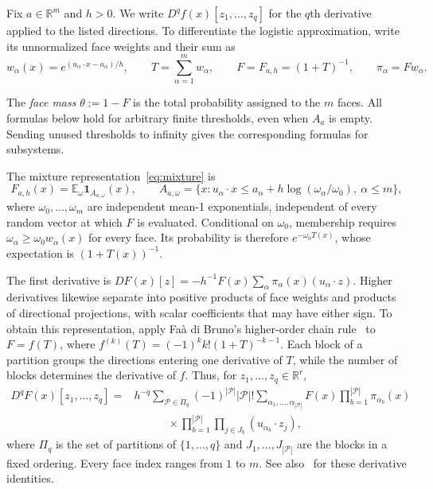 \documentclass[11pt,letterpaper]{article}
\theoremstyle{remark}
\newcommand{\E}{\mathbb E}
\newcommand{\R}{\mathbb R}
\newcommand{\ind}{\mathbf 1}
\begin{document}
Fix \(a\in\R^m\) and \(h>0\). We write
\(D^qf(x)[z_1,\ldots,z_q]\) for the \(q\)th derivative applied to
the listed directions. To differentiate the logistic approximation,
write its unnormalized face weights and their sum as
\[
 w_\alpha(x)=e^{(u_\alpha\cdot x-a_\alpha)/h},\qquad
 T=\sum_{\alpha=1}^m w_\alpha,\qquad
 F=F_{a,h}=(1+T)^{-1},\qquad \pi_\alpha=Fw_\alpha.
\]

The \emph{face mass} \(\theta:=1-F\) is the total probability assigned
to the \(m\) faces. All formulas below hold for arbitrary finite
thresholds, even when \(A_a\) is empty. Sending unused thresholds
to infinity gives the corresponding formulas for subsystems.

The mixture representation~\eqref{eq:mixture} is
\[
 F_{a,h}(x)=\E_\omega\ind_{A_{a,\omega}}(x),\qquad
 A_{a,\omega}=\{x:u_\alpha\cdot x\le
 a_\alpha+h\log(\omega_\alpha/\omega_0),\ \alpha\le m\},
\]
where \(\omega_0,\ldots,\omega_m\) are independent mean-1
exponentials, independent of every random vector at which \(F\) is
evaluated. Conditional on \(\omega_0\), membership requires
\(\omega_\alpha\ge\omega_0w_\alpha(x)\) for every face.
Its probability is therefore \(e^{-\omega_0T(x)}\), whose
expectation is \((1+T(x))^{-1}\).

The first derivative is
\(DF(x)[z]=-h^{-1}F(x)\sum_\alpha\pi_\alpha(x)(u_\alpha\cdot z)\).
Higher derivatives likewise separate into positive products of face
weights and products of directional projections, with scalar coefficients
that may have either sign. To obtain this representation, apply
Fa\`a di Bruno's higher-order chain rule~\cite{Comtet1974}
to \(F=f(T)\), where
\(f^{(k)}(T)=(-1)^k k!(1+T)^{-k-1}\). Each block of a partition
groups the directions entering one derivative of \(T\), while the
number of blocks determines the derivative of \(f\). Thus, for
\(z_1,\ldots,z_q\in\R^r\),
\begin{equation}
 \begin{split}
 D^qF(x)[z_1,\ldots,z_q]
 ={}&h^{-q}\sum_{\mathcal P\in\Pi_q}(-1)^{|\mathcal P|}|\mathcal P|!
 \sum_{\alpha_1,\ldots,\alpha_{|\mathcal P|}}
 F(x)\prod_{b=1}^{|\mathcal P|}\pi_{\alpha_b}(x)\\
 &\hspace{3em}\times
 \prod_{b=1}^{|\mathcal P|}\prod_{j\in J_b}
 (u_{\alpha_b}\cdot z_j),
 \end{split}
 \label{appx-eq:partition-derivative}
\end{equation}
where \(\Pi_q\) is the set of partitions of \(\{1,\ldots,q\}\)
and \(J_1,\ldots,J_{|\mathcal P|}\) are the blocks in a fixed
ordering. Every face index ranges from \(1\) to \(m\).
See also~\cite[Lemma~13]{GaoZhang} for these derivative identities.
\end{document}

